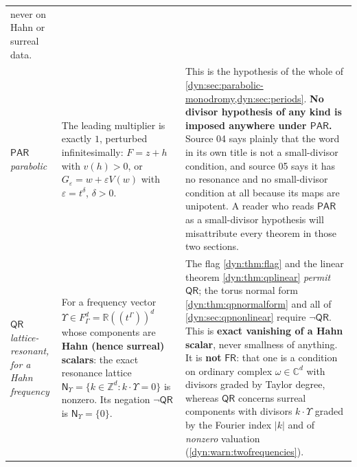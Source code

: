 \documentclass[11pt,letterpaper]{article}
\theoremstyle{definition}
\theoremstyle{remark}
\newcommand{\C}{\mathbb C}
\newcommand{\R}{\mathbb R}
\newcommand{\Z}{\mathbb Z}
\newcommand{\eps}{\varepsilon}
\newcommand{\fres}{\mathsf{FR}}
\newcommand{\pares}{\mathsf{PAR}}
\newcommand{\qres}{\mathsf{QR}}
\newcommand{\qlat}{\mathsf N_{\Upsilon}}
\numberwithin{equation}{section}
\begin{document}
\begin{longtable}{@{}P{0.13\textwidth}P{0.40\textwidth}P{0.40\textwidth}@{}}
never on Hahn or surreal data.\\[4pt]
$\pares$\newline \emph{parabolic}
&
The leading multiplier is exactly $1$, perturbed infinitesimally:
$F=z+h$ with $v(h)>0$, or $G_\eps=w+\eps V(w)$ with $\eps=t^{\delta}$,
$\delta>0$.
&
This is the hypothesis of the whole of
\cref{dyn:sec:parabolic-monodromy,dyn:sec:periods}. \textbf{No divisor
hypothesis of any kind is imposed anywhere under $\pares$.} Source 04
says plainly that the word in its own title is not a small-divisor
condition, and source 05 says it has no resonance and no small-divisor
condition at all because its maps are unipotent. A reader who reads
$\pares$ as a small-divisor hypothesis will misattribute every theorem in
those two sections.\\[4pt]
$\qres$\newline \emph{lattice-resonant, for a Hahn frequency}
&
For a frequency vector $\Upsilon\in F_\Gamma^{d}=\R((t^{\Gamma}))^{d}$ whose
components are \textbf{Hahn (hence surreal) scalars}: the exact resonance
lattice $\qlat=\{k\in\Z^{d}:k\cdot\Upsilon=0\}$ is nonzero. Its negation
$\lnot\qres$ is $\qlat=\{0\}$.
&
The flag \cref{dyn:thm:flag} and the linear theorem
\cref{dyn:thm:qplinear} \emph{permit} $\qres$; the torus normal form
\cref{dyn:thm:qpnormalform} and all of \cref{dyn:sec:qpnonlinear} require
$\lnot\qres$. This is \textbf{exact vanishing of a Hahn scalar}, never
smallness of anything. It is \textbf{not} $\fres$: that one is a condition
on ordinary complex $\omega\in\C^{d}$ with divisors graded by Taylor
degree, whereas $\qres$ concerns surreal components with divisors
$k\cdot\Upsilon$ graded by the Fourier index $|k|$ and of \emph{nonzero}
valuation (\cref{dyn:warn:twofrequencies}).\\
\bottomrule
\end{longtable}
\end{document}

